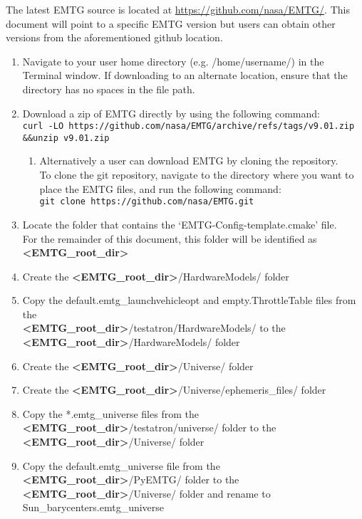 
The latest EMTG source is located at \url{https://github.com/nasa/EMTG/}. This document will point to a specific EMTG version but users can obtain other versions from the aforementioned github location.

\begin{enumerate}
	\item Navigate to your user home directory (e.g. /home/username/) in the Terminal window. If downloading to an alternate location, ensure that the directory has no spaces in the file path.
	\item Download a zip of EMTG directly by using the following command: \\ 
	
	\texttt{curl -LO https://github.com/nasa/EMTG/archive/refs/tags/v9.01.zip \&\&\newline\indent unzip v9.01.zip}
	
	\begin{enumerate}
		\item Alternatively a user can download EMTG by cloning the repository. \\ To clone the git repository, navigate to the directory where you want to place the \ac{EMTG} files, and run the following command: \\

		\texttt{git clone https://github.com/nasa/EMTG.git}

	\end{enumerate}
	\item Locate the folder that contains the ‘EMTG-Config-template.cmake’ file. \\ For the remainder of this document, this folder will be identified as \textbf{\textless EMTG\_root\_dir\textgreater}	
	\item Create the \textbf{\textless EMTG\_root\_dir\textgreater}/HardwareModels/ folder
	\item Copy the default.emtg\_launchvehicleopt and empty.ThrottleTable files from the \\ \textbf{\textless EMTG\_root\_dir\textgreater}/testatron/HardwareModels/ to the \\ \textbf{\textless EMTG\_root\_dir\textgreater}/HardwareModels/ folder
	\item Create the \textbf{\textless EMTG\_root\_dir\textgreater}/Universe/ folder
	\item Create the \textbf{\textless EMTG\_root\_dir\textgreater}/Universe/ephemeris\_files/ folder
	\item Copy the *.emtg\_universe files from the  \textbf{\textless EMTG\_root\_dir\textgreater}/testatron/universe/ folder to the \textbf{\textless EMTG\_root\_dir\textgreater}/Universe/ folder
	\item Copy the default.emtg\_universe file from the \textbf{\textless EMTG\_root\_dir\textgreater}/PyEMTG/ folder to the \textbf{\textless EMTG\_root\_dir\textgreater}/Universe/ folder and rename to Sun\_barycenters.emtg\_universe
\end{enumerate}